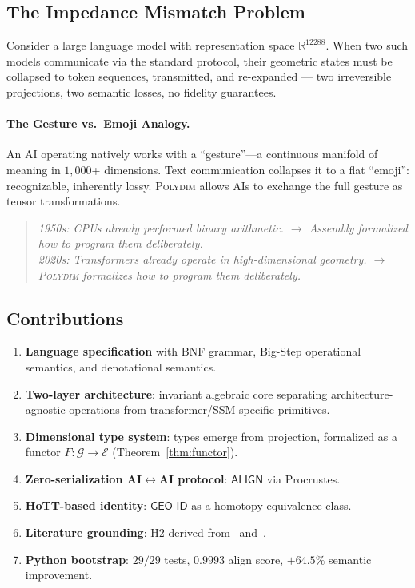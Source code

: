 \documentclass[10pt,twocolumn]{article}
\theoremstyle{plain}
\theoremstyle{definition}
\theoremstyle{remark}
\newcommand{\RR}{\mathbb{R}}
\newcommand{\Align}{\mathsf{ALIGN}}
\newcommand{\GeoID}{\mathsf{GEO\_ID}}
\begin{document}
\subsection{The Impedance Mismatch Problem}

Consider a large language model with representation space $\RR^{12288}$.
When two such models communicate via the standard protocol, their geometric
states must be collapsed to token sequences, transmitted, and re-expanded ---
two irreversible projections, two semantic losses, no fidelity guarantees.

\paragraph{The Gesture vs.\ Emoji Analogy.}
An AI operating natively works with a ``gesture''---a continuous manifold of
meaning in $1{,}000$+ dimensions. Text communication collapses it to a
flat ``emoji'': recognizable, inherently lossy. \textsc{Polydim} allows AIs
to exchange the full gesture as tensor transformations.

\begin{quote}\small
\textit{1950s: CPUs already performed binary arithmetic.
$\to$ Assembly formalized how to program them deliberately.}\\[4pt]
\textit{2020s: Transformers already operate in high-dimensional geometry.
$\to$ \textsc{Polydim} formalizes how to program them deliberately.}
\end{quote}

\subsection{Contributions}

\begin{enumerate}[leftmargin=*,label=\arabic*.,noitemsep]
\item \textbf{Language specification} with BNF grammar, Big-Step operational
      semantics, and denotational semantics.
\item \textbf{Two-layer architecture}: invariant algebraic core separating
      architecture-agnostic operations from transformer/SSM-specific primitives.
\item \textbf{Dimensional type system}: types emerge from projection,
      formalized as a functor $F\colon \mathcal{G} \to \mathcal{E}$
      (Theorem~\ref{thm:functor}).
\item \textbf{Zero-serialization AI$\leftrightarrow$AI protocol}: $\Align$
      via Procrustes.
\item \textbf{HoTT-based identity}: $\GeoID$ as a homotopy equivalence class.
\item \textbf{Literature grounding}: H2 derived from~\citet{suarez2026invariant}
      and~\citet{oneill2025endofunctor}.
\item \textbf{Python bootstrap}: $29/29$ tests, $0.9993$ align score,
      $+64.5\%$ semantic improvement.
\end{enumerate}
\end{document}
